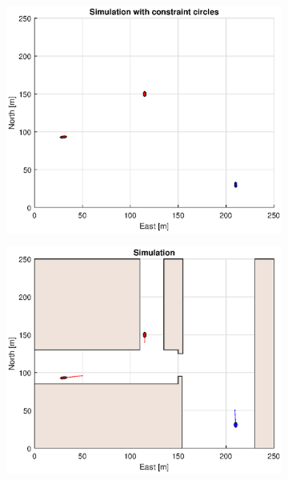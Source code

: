 \begin{figure}[!b] %
    \begin{subfigure}[b]{0.49\textwidth}
        \centering
        \includegraphics[width=\textwidth]{Images/Figures/Havn1/Simple0_f1_Frame1}
    \end{subfigure}
    \hfill
    \begin{subfigure}[b]{0.499\textwidth}
        \centering
        \includegraphics[width=\textwidth]{Images/Figures/Havn1/Simple0_f600_Frame1}

\end{subfigure}
\end{figure}
